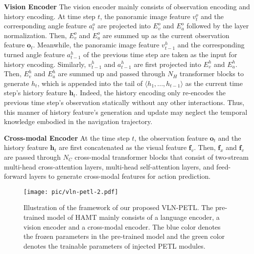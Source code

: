 \documentclass[10pt,twocolumn,letterpaper]{article}
\def\vf{{\bm{f}}}
\def\vh{{\bm{h}}}
\def\vo{{\bm{o}}}
\begin{document}
\noindent\textbf{Vision Encoder} 
The vision encoder mainly consists of observation encoding and history encoding. At time step $t$, the panoramic image feature $v_{t}^o$ and the corresponding angle feature $a_{t}^o$ are projected into $E_v^o$ and $E_a^o$ followed by the layer normalization. Then, $E_v^o$ and $E_a^o$ are summed up as the current observation feature $\vo_t$. Meanwhile, the panoramic image feature $v^h_{t-1}$ and the corresponding turned angle feature $a_{t-1}^h$ of the previous time step are taken as the input for history encoding. Similarly, $v^h_{t-1}$ and $a_{t-1}^h$ are first projected into $E_v^h$ and $E_a^h$. Then, $E_v^h$ and $E_a^h$ are summed up and passed through $N_H$ transformer blocks to generate $h_t$, which is appended into the tail of $\langle h_1,...,h_{t-1}\rangle$ as the current time step's history feature $\vh_t$. Indeed, the history encoding only re-encodes the previous time step's observation statically without any other interactions. Thus, this manner of history feature's generation and update may neglect the temporal knowledge embodied in the navigation trajectory. 


\noindent\textbf{Cross-modal Encoder}
At the time step $t$, the observation feature $\vo_t$ and the history feature $\vh_t$
are first concatenated as the visual feature $\vf_v$. Then, $\vf_x$ and $\vf_v$ are passed through $N_C$ cross-modal transformer blocks that consist of two-stream multi-head cross-attention layers, multi-head self-attention layers, and feed-forward layers to generate cross-modal features for action prediction.


\begin{figure}[!t]
	\begin{center}
		\texttt{[image: pic/vln-petl-2.pdf]}
	\end{center}
	\vspace{-15pt}
	\caption{Illustration of the framework of our proposed VLN-PETL. The pre-trained model of HAMT mainly consists of a language encoder, a vision encoder and a cross-modal encoder. The blue color denotes the frozen parameters in the pre-trained model and the green color denotes the trainable parameters of injected PETL modules.}
	\label{fig:vln}
	\vspace{-10pt}
\end{figure}


\vspace{-5pt}
\end{document}
